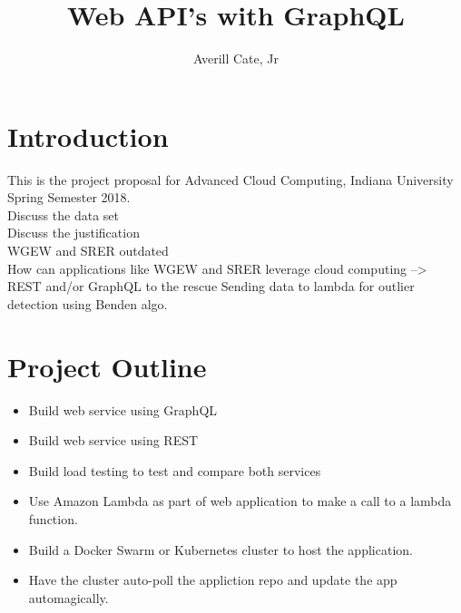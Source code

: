 \documentclass{article}
\title{Web API's with GraphQL}
\author{Averill Cate, Jr}
\begin{document}
\maketitle

\section{Introduction}
This is the project proposal for Advanced Cloud Computing, Indiana University 
Spring Semester 2018.
\\
Discuss the data set\\
Discuss the justification\\
WGEW and SRER outdated\\
How can applications like WGEW and SRER leverage cloud computing --> REST and/or GraphQL to the rescue
Sending data to lambda for outlier detection using Benden algo.

\section{Project Outline}
\begin{itemize}
\item Build web service using GraphQL
\item Build web service using REST
\item Build load testing to test and compare both services
\item Use Amazon Lambda as part of web application to make a call to a lambda function.
\item Build a Docker Swarm or Kubernetes cluster to host the application.
\item Have the cluster auto-poll the appliction repo and update the app automagically.
\end{itemize}
\end{document}
